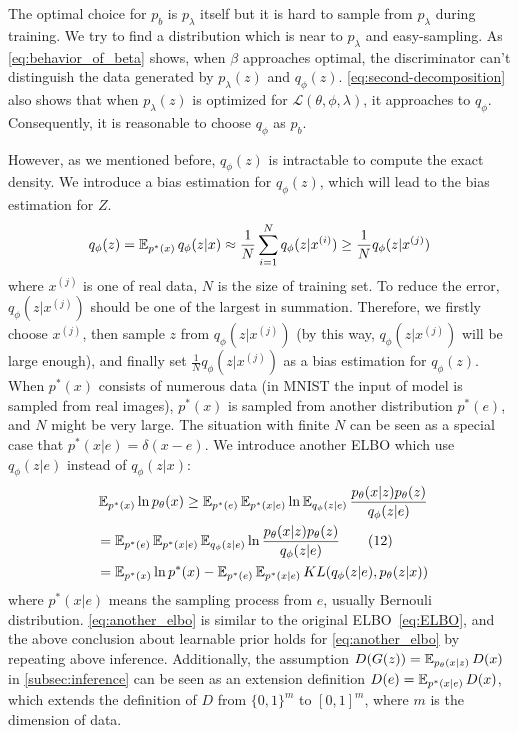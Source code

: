 The optimal choice for $p_b$ is $p_\lambda$ itself but it is hard to sample from $p_\lambda$ during training. We try to find a distribution which is near to $p_\lambda$ and easy-sampling. As \cref{eq:behavior_of_beta} shows, when $\beta$ approaches optimal, the discriminator can't distinguish the data generated by $p_\lambda(z)$ and $q_\phi(z)$.  \cref{eq:second-decomposition} also shows that when $p_\lambda(z)$ is optimized for $\mathcal{L}(\theta, \phi, \lambda)$, it approaches to $q_\phi$. Consequently, it is reasonable to choose $q_\phi$ as $p_b$. 

However, as we mentioned before, $q_\phi(z)$ is intractable to compute the exact density. We introduce a bias estimation for $q_\phi(z)$, which will lead to the bias estimation for $Z$. 
\begin{equation*}
	q_\phi(z) = \operatorname{\mathbb{E}}_{p^*(x)} q_\phi(z|x) \approx \frac{1}{N}\sum_{i=1}^N q_\phi(z|x^{(i)}) \geq \frac{1}{N} q_\phi(z|x^{(j)})
\end{equation*}
where $x^{(j)}$ is one of real data, $N$ is the size of training set. To reduce the error, $q_\phi(z|x^{(j)})$ should be one of the largest in summation. Therefore, we firstly choose $x^{(j)}$, then sample $z$ from $q_\phi(z|x^{(j)})$ (by this way, $q_\phi(z|x^{(j)})$ will be large enough), and finally set $\frac{1}{N} q_\phi(z|x^{(j)})$ as a bias estimation for $q_\phi(z)$. When $p^*(x)$ consists of numerous data (\EG in MNIST the input of model is sampled from real images), $p^*(x)$ is sampled from another distribution $p^*(e)$, and $N$ might be very large. The situation with finite $N$ can be seen as a special case that $p^*(x|e) = \delta(x - e)$. We introduce another ELBO which use $q_\phi(z|e)$ instead of $q_\phi(z|x)$:
\begin{align*}~\label{eq:another_elbo}
	&\operatorname{\mathbb{E}}_{p^*(x)} \ln p_\theta(x) \geq \operatorname{\mathbb{E}}_{p^*(e)} \operatorname{\mathbb{E}}_{p^*(x|e)} \ln \operatorname{\mathbb{E}}_{q_\phi(z|e)} \frac{p_\theta(x|z)p_\theta(z)}{q_\phi(z|e)} \\
	 &= \operatorname{\mathbb{E}}_{p^*(e)} \operatorname{\mathbb{E}}_{p^*(x|e)} \operatorname{\mathbb{E}}_{q_\phi(z|e)} \ln \frac{p_\theta(x|z)p_\theta(z)}{q_\phi(z|e)} \tag{12} \\
	 &= \operatorname{\mathbb{E}}_{p^*(x)} \ln p^*(x) - \operatorname{\mathbb{E}}_{p^*(e)} \operatorname{\mathbb{E}}_{p^*(x|e)} KL(q_\phi(z|e), p_\theta(z|x))
\end{align*} 
where $p^*(x|e)$ means the sampling process from $e$, usually Bernouli distribution. \cref{eq:another_elbo} is similar to the original ELBO~\cref{eq:ELBO}, and the above conclusion about learnable prior holds for \cref{eq:another_elbo} by repeating above inference. Additionally, the assumption $D(G(z)) = \operatorname{\mathbb{E}}_{p_\theta(x|z)} D(x)$ in \cref{subsec:inference} can be seen as an extension definition $D(e) = \operatorname{\mathbb{E}}_{p^*(x|e)} D(x)$, which extends the definition of $D$ from $\{0, 1\}^m$ to $[0, 1]^m$, where $m$ is the dimension of data. %
